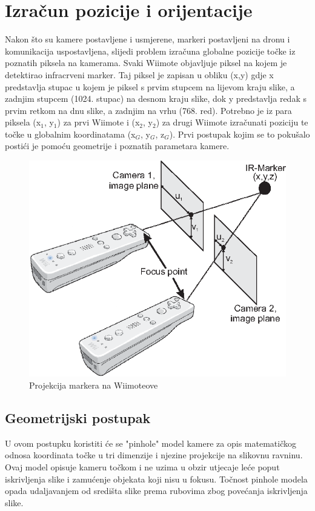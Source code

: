 \documentclass[times, utf8, diplomski]{fer}
\begin{document}
\chapter{Izračun pozicije i orijentacije}
Nakon što su kamere postavljene i usmjerene, markeri postavljeni na dronu i komunikacija uspostavljena, slijedi problem izračuna globalne pozicije točke iz poznatih piksela na kamerama. Svaki Wiimote objavljuje piksel na kojem je detektirao infracrveni marker. Taj piksel je zapisan u obliku (x,y) gdje x predstavlja stupac u kojem je piksel s prvim stupcem na lijevom kraju slike, a zadnjim stupcem (1024. stupac) na desnom kraju slike, dok y predstavlja redak s prvim retkom na dnu slike, a zadnjim na vrhu (768. red). Potrebno je iz para piksela (x$_1$, y$_1$) za prvi Wiimote i (x$_2$, y$_2$) za drugi Wiimote izračunati poziciju te točke u globalnim koordinatama (x$_G$, y$_G$, z$_G$). Prvi postupak kojim se to pokušalo postići je pomoću geometrije i poznatih parametara kamere.

\begin{figure}[h]
\centering
\includegraphics[width=.6\textwidth]{wiimote2_rays}
\caption{Projekcija markera na Wiimoteove \protect\footnotemark}
\label{fig:zrake}
\end{figure}

\section{Geometrijski postupak}
U ovom postupku koristiti će se "pinhole" model kamere za opis matematičkog odnosa koordinata točke u tri dimenzije i njezine projekcije na slikovnu ravninu. Ovaj model opisuje kameru točkom i ne uzima u obzir utjecaje leće poput iskrivljenja slike i zamućenje objekata koji nisu u fokusu. Točnost pinhole modela opada udaljavanjem od središta slike prema rubovima zbog povećanja iskrivljenja slike.
\end{document}
